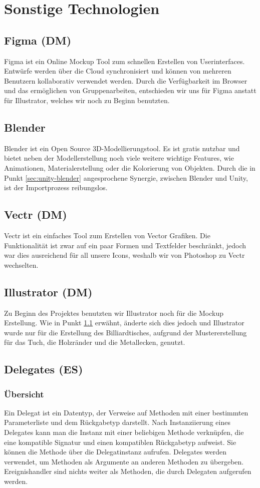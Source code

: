 \section{Sonstige Technologien}
\subsection{Figma (DM)} \label{sec:figma}
Figma ist ein Online Mockup Tool zum schnellen Erstellen von Userinterfaces. Entwürfe werden über die Cloud synchronisiert und können von mehreren Benutzern kollaborativ verwendet werden. Durch die Verfügbarkeit im Browser und das ermöglichen von Gruppenarbeiten, entschieden wir uns für Figma anstatt für Illustrator, welches wir noch zu Beginn benutzten.
\subsection{Blender} \label{sec:blender}
Blender ist ein Open Source 3D-Modellierungstool. Es ist gratis nutzbar und bietet neben der Modellerstellung noch viele weitere wichtige Features, wie Animationen, Materialerstellung oder die Kolorierung von Objekten. Durch die in Punkt \ref{sec:unity-blender} angesprochene Synergie, zwischen Blender und Unity, ist der Importprozess reibungslos.
\subsection{Vectr (DM)}
Vectr ist ein einfaches Tool zum Erstellen von Vector Grafiken. Die Funktionalität ist zwar auf ein paar Formen und Textfelder beschränkt, jedoch war dies ausreichend für all unsere Icons, weshalb wir von Photoshop zu Vectr wechselten.
\subsection{Illustrator (DM)}
Zu Beginn des Projektes benutzten wir Illustrator noch für die Mockup Erstellung. Wie in Punkt \ref{sec:figma} erwähnt, änderte sich dies jedoch und Illustrator wurde nur für die Erstellung des Billiardtisches, aufgrund der Mustererstellung für das Tuch, die Holzränder und die Metallecken, genutzt.
\subsection{Delegates (ES)}
\subsubsection{Übersicht}
Ein Delegat ist ein Datentyp, der Verweise auf Methoden mit einer bestimmten Parameterliste und dem Rückgabetyp darstellt. Nach Instanziierung eines Delegates kann man die Instanz mit einer beliebigen Methode verknüpfen, die eine kompatible Signatur und einen kompatiblen Rückgabetyp aufweist. Sie können die Methode über die Delegatinstanz aufrufen.
Delegates werden verwendet, um Methoden als Argumente an anderen Methoden zu übergeben. Ereignishandler sind nichts weiter als Methoden, die durch Delegaten aufgerufen werden.
